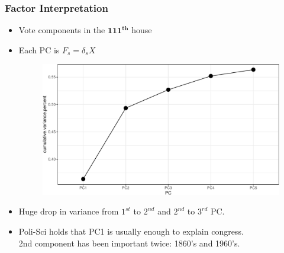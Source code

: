 \documentclass[
  shownotes,
  xcolor={svgnames},
  hyperref={colorlinks,citecolor=DarkBlue,linkcolor=DarkRed,urlcolor=DarkBlue}
  , aspectratio=169]{beamer}
\newcommand{\sg}{\color{DarkSlateGray}}
\newcommand{\bs}[1]{\boldsymbol{#1}}
\begin{document}
\begin{frame}[fragile]
\frametitle{Factor Interpretation}



\begin{itemize}

  \item Vote components in the $\bs{111^{th}}$ house
 
 \item Each PC is $F_s = \delta_sX$ 

  \begin{figure}[H] \centering
            \captionsetup{justification=centering}
              \includegraphics[scale=0.4]{figures/scree_plot}
              
 \end{figure}

\item Huge drop in variance from $1^{st}$ to $2^{nd}$ and  $2^{nd}$ to $3^{rd}$ PC.
\item Poli-Sci holds that PC1 is usually enough to explain congress. \\\sg 2nd component has been important twice: 1860's and 1960's.

\end{itemize}

\end{frame}
\end{document}
